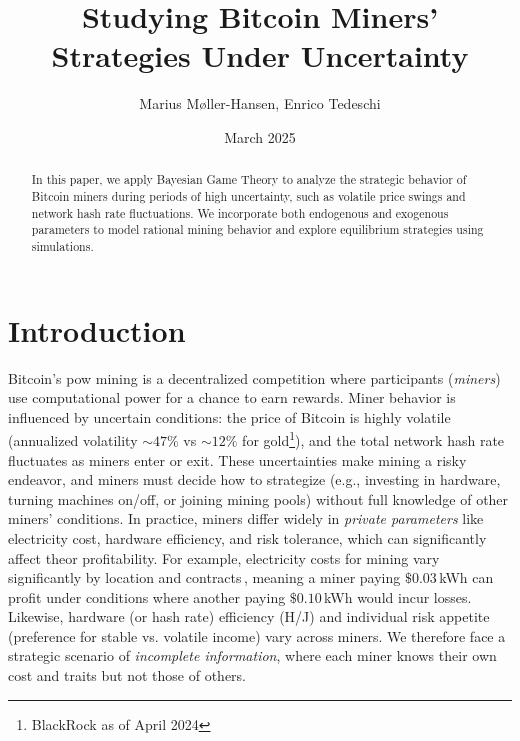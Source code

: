 \documentclass[12pt]{article}
\title{Studying Bitcoin Miners' Strategies Under Uncertainty}
\author{Marius M{\o}ller-Hansen, Enrico Tedeschi}
\affil{UiT - The Arctic University of Norway}
\date{March 2025}
\begin{document}
\maketitle

\begin{abstract}
	In this paper, we apply Bayesian Game Theory to analyze the strategic behavior of Bitcoin miners during periods of high uncertainty, such as volatile price swings and network hash rate fluctuations. We incorporate both endogenous and exogenous parameters to model rational mining behavior and explore equilibrium strategies using simulations.
\end{abstract}

\section{Introduction}
Bitcoin's \gls{pow} mining is a decentralized competition where participants (\emph{miners}) use computational power for a chance to earn rewards. Miner behavior is influenced by uncertain conditions: the price of Bitcoin is highly volatile (annualized volatility $\sim47\%$ vs $\sim12\%$ for gold\footnote{BlackRock as of April 2024}), and the total network hash rate fluctuates as miners enter or exit. These uncertainties make mining a risky endeavor, and miners must decide how to strategize (e.g., investing in hardware, turning machines on/off, or joining mining pools) without full knowledge of other miners' conditions. In practice, miners differ widely in \emph{private parameters} like electricity cost, hardware efficiency, and risk tolerance, which can significantly affect theor profitability. For example, electricity costs for mining vary significantly by location and contracts\,\cite{tedeschi2024mining}, meaning a miner paying $\$0.03$\,kWh can profit under conditions where another paying $\$0.10$\,kWh would incur losses. Likewise, hardware (or hash rate) efficiency (H/J) and individual risk appetite (preference for stable vs. volatile income) vary across miners. We therefore face a strategic scenario of \emph{incomplete information}, where each miner knows their own cost and traits but not those of others.
\end{document}
